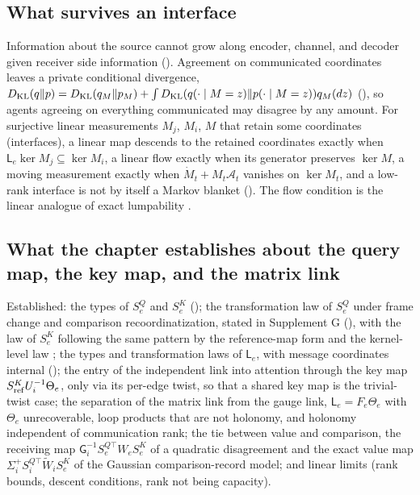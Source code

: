 \subsection{What survives an interface}
\label{comp:ch06-information}

Information about the source cannot grow along encoder, channel, and decoder given receiver side information
(). Agreement on communicated coordinates leaves a private conditional divergence,
$D_{\mathrm{KL}}(q\Vert p)=D_{\mathrm{KL}}(q_M\Vert p_M)+\int D_{\mathrm{KL}}(q(\cdot\mid M=z)\Vert p(\cdot\mid M=z))q_M(dz)$
(), so agents agreeing on everything communicated may disagree by any amount. For surjective linear
measurements $M_j$, $M_i$, $M$ that retain some coordinates (interfaces), a linear map descends to the retained coordinates
exactly when $\mathsf L_e\ker M_j\subseteq\ker M_i$, a linear flow exactly when its generator
preserves $\ker M$, a moving measurement exactly when $\dot M_t+M_t\mathcal A_t$ vanishes on $\ker M_t$, and a low-rank interface
is not by itself a Markov blanket (). The flow condition is the linear analogue of exact
lumpability \citep{KemenySnell1976}.

\subsection{What the chapter establishes about the query map, the key map, and the matrix link}
\label{comp:ch06-sqk}

Established: the types of $S^Q_e$ and $S^K_e$ (); the transformation law of $S^Q_e$
under frame change and comparison recoordinatization, stated in Supplement G (), with the law of
$S^K_e$ following the same pattern by the reference-map form and the kernel-level law ;
the types and transformation laws of $\mathsf L_e$, with message coordinates internal ();
the entry of the independent link into attention through the key map
$S^K_{\rm ref}U_i^{-1}\Theta_e$, only via its per-edge twist, so that a shared key map is the trivial-twist case; the separation
of the matrix link from the gauge link, $\mathsf L_e=F_e\Theta_e$ with $\Theta_e$ unrecoverable, loop products that are not
holonomy, and holonomy independent of communication rank; the tie between value and comparison, the receiving map
$\mathsf G_i^{-1}S^{Q\top}_eW_eS^K_e$ of a quadratic disagreement and the exact value map
$\Sigma^+_iS^{Q\top}_i\widetilde W_iS^K_e$ of the Gaussian comparison-record model; and linear limits (rank bounds, descent
conditions, rank not being capacity).

